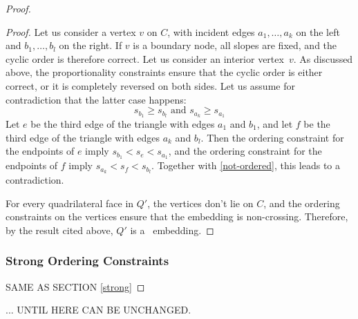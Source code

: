 \begin{proof}
\begin{proof}
Let us consider a vertex $v$ on $C$, with
incident edges $a_1,\ldots,a_k$ 
on the left and $b_1,\ldots,b_l$ on the
right.
If $v$ is a boundary node, all slopes are fixed, and the cyclic order
is therefore correct.
Let us consider an interior vertex~$v$.
%
 As discussed above, the proportionality constraints ensure that
the cyclic order is either correct, or it is completely reversed on both
sides.
Let us assume for contradiction that the latter case happens:
\begin{equation}
  \label{eq:not-ordered}
s_{b_1}\ge s_{b_l}
\text{ and }
s_{a_k}\ge s_{a_1}
\end{equation}
Let $e$ be the third edge of the triangle with edges $a_1$ and $b_1$,
and let 
 $f$ be the third edge of the triangle with edges $a_k$ and $b_l$.
Then the ordering constraint for the endpoints of $e$ imply
\begin{math}
  s_{b_1}<s_e<s_{a_1}
\end{math},
and the ordering constraint for the endpoints of $f$ imply
\begin{math}
  s_{a_k}<s_f<s_{b_l}
\end{math}.
Together with \eqref{not-ordered}, this leads to a contradiction.

   For every quadrilateral face in $Q'$, the vertices don't lie on
   $C$, and the ordering constraints on the vertices
   ensure that the embedding is non-crossing. Therefore, by the result
   cited above, $Q'$ is a \Fary\ embedding. %
\end{proof}


\subsubsection{Strong Ordering Constraints}
SAME AS SECTION \ref{strong}

\end{proof}

... UNTIL HERE CAN BE UNCHANGED.

